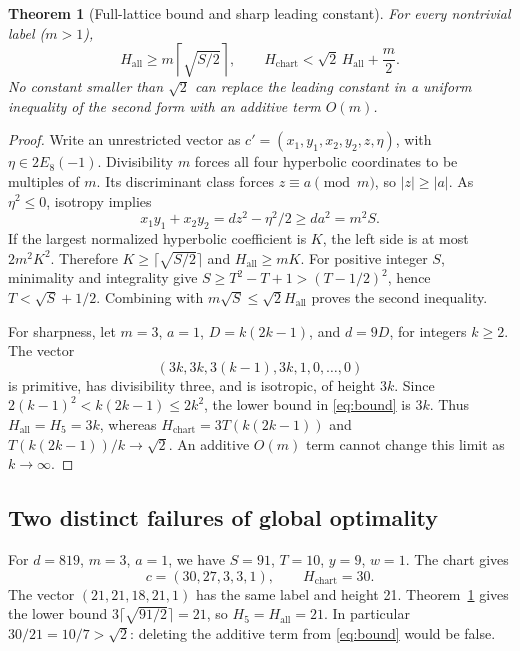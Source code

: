 \documentclass[11pt]{article}
\newtheorem{theorem}{Theorem}[section]
\theoremstyle{remark}\newtheorem{remark}[theorem]{Remark}
\begin{document}
\begin{theorem}[Full-lattice bound and sharp leading constant]\label{thm:comparison}
For every nontrivial label ($m>1$),
\begin{equation}\label{eq:bound}
 H_{\mathrm{all}}\geq m\left\lceil\sqrt{S/2}\right\rceil,
 \qquad H_{\mathrm{chart}}<\sqrt2\,H_{\mathrm{all}}+\frac m2.
\end{equation}
No constant smaller than $\sqrt2$ can replace the leading constant in a uniform inequality of the second form with an additive term $O(m)$.
\end{theorem}
\begin{proof}
Write an unrestricted vector as $c'=(x_1,y_1,x_2,y_2,z,\eta)$, with $\eta\in2E_8(-1)$. Divisibility $m$ forces all four hyperbolic coordinates to be multiples of $m$. Its discriminant class forces $z\equiv a\pmod m$, so $|z|\geq|a|$. As $\eta^2\leq0$, isotropy implies
\[
 x_1y_1+x_2y_2=dz^2-\eta^2/2\geq da^2=m^2S.
\]
If the largest normalized hyperbolic coefficient is $K$, the left side is at most $2m^2K^2$. Therefore $K\geq\lceil\sqrt{S/2}\rceil$ and $H_{\mathrm{all}}\geq mK$. For positive integer $S$, minimality and integrality give $S\geq T^2-T+1>(T-1/2)^2$, hence $T<\sqrt S+1/2$. Combining with $m\sqrt S\leq\sqrt2 H_{\mathrm{all}}$ proves the second inequality.

For sharpness, let $m=3$, $a=1$, $D=k(2k-1)$, and $d=9D$, for integers $k\geq2$. The vector
\begin{equation}\label{eq:sharp}
 (3k,3k,3(k-1),3k,1,0,\ldots,0)
\end{equation}
is primitive, has divisibility three, and is isotropic, of height $3k$. Since $2(k-1)^2<k(2k-1)\leq2k^2$, the lower bound in \eqref{eq:bound} is $3k$. Thus $H_{\mathrm{all}}=H_5=3k$, whereas $H_{\mathrm{chart}}=3T(k(2k-1))$ and $T(k(2k-1))/k\to\sqrt2$. An additive $O(m)$ term cannot change this limit as $k\to\infty$.
\end{proof}

\subsection{Two distinct failures of global optimality}
For $d=819$, $m=3$, $a=1$, we have $S=91$, $T=10$, $y=9$, $w=1$. The chart gives
\[
 c=(30,27,3,3,1),\qquad H_{\mathrm{chart}}=30.
\]
The vector $(21,21,18,21,1)$ has the same label and height 21. Theorem~\ref{thm:comparison} gives the lower bound $3\lceil\sqrt{91/2}\rceil=21$, so $H_5=H_{\mathrm{all}}=21$. In particular $30/21=10/7>\sqrt2$: deleting the additive term from \eqref{eq:bound} would be false.
\end{document}
